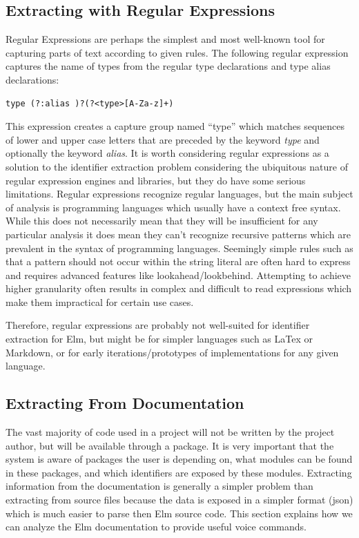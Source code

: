 \documentclass[../thesis.tex]{subfiles}
\begin{document}
\subsection{Extracting with Regular Expressions}
Regular Expressions are perhaps the simplest and most well-known tool for capturing parts of text according to given rules.
The following regular expression captures the name of types from the regular type declarations and type alias declarations:
\begin{verbatim}
type (?:alias )?(?<type>[A-Za-z]+)
\end{verbatim}
This expression creates a capture group named ``type'' which matches sequences of lower and upper case letters
that are preceded by the keyword \textit{type} and optionally the keyword \textit{alias}.
It is worth considering regular expressions as a solution to the identifier extraction problem
considering the ubiquitous nature of regular expression engines and libraries, but they do have some serious limitations.
Regular expressions recognize regular languages, but the main subject of analysis is programming languages
which usually have a context free syntax.
While this does not necessarily mean that they will be insufficient for any particular analysis
it does mean they can't recognize recursive patterns which are prevalent in the syntax of programming languages.
Seemingly simple rules such as that a pattern should not occur within the string literal are often
hard to express and requires advanced features like lookahead/lookbehind.
Attempting to achieve higher granularity often results in complex and difficult to read expressions
which make them impractical for certain use cases.

Therefore, regular expressions are probably not well-suited for identifier extraction for Elm, but might be for simpler languages
such as LaTex or Markdown, or for early iterations/prototypes of implementations for any given language.


\subsection{Extracting From Documentation}%
\label{sub:dependencies}
The vast majority of code used in a project will not be written by the project author, but will be available
through a package. It is very important that the system is aware of packages the user is depending on, what modules can be found in these packages, 
and which identifiers are exposed by these modules. Extracting information from the documentation is generally a simpler problem
than extracting from source files because the data is exposed in a simpler format (json) which is much easier to parse then Elm source code.
This section explains how we can analyze the Elm documentation to provide useful voice commands.
\end{document}
